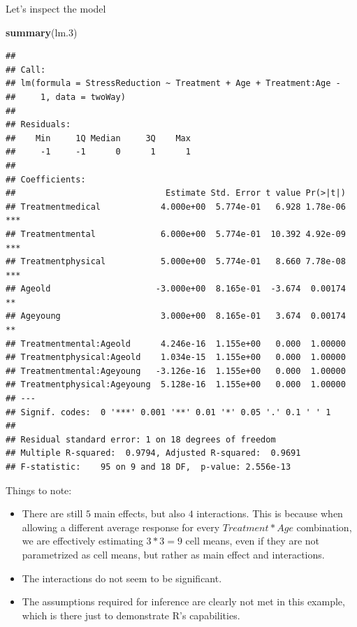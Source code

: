 \documentclass[]{book}
\newenvironment{Shaded}{\begin{snugshade}}{\end{snugshade}}
\newcommand{\KeywordTok}[1]{\textcolor[rgb]{0.13,0.29,0.53}{\textbf{#1}}}
\newcommand{\DecValTok}[1]{\textcolor[rgb]{0.00,0.00,0.81}{#1}}
\newcommand{\NormalTok}[1]{#1}
\providecommand{\tightlist}{%
  \setlength{\itemsep}{0pt}\setlength{\parskip}{0pt}}
\theoremstyle{definition}
\theoremstyle{definition}
\theoremstyle{definition}
\theoremstyle{remark}
\begin{document}
Let's inspect the model

\begin{Shaded}
\begin{Highlighting}[]
\KeywordTok{summary}\NormalTok{(lm.}\DecValTok{3}\NormalTok{)}
\end{Highlighting}
\end{Shaded}

\begin{verbatim}
## 
## Call:
## lm(formula = StressReduction ~ Treatment + Age + Treatment:Age - 
##     1, data = twoWay)
## 
## Residuals:
##    Min     1Q Median     3Q    Max 
##     -1     -1      0      1      1 
## 
## Coefficients:
##                              Estimate Std. Error t value Pr(>|t|)    
## Treatmentmedical            4.000e+00  5.774e-01   6.928 1.78e-06 ***
## Treatmentmental             6.000e+00  5.774e-01  10.392 4.92e-09 ***
## Treatmentphysical           5.000e+00  5.774e-01   8.660 7.78e-08 ***
## Ageold                     -3.000e+00  8.165e-01  -3.674  0.00174 ** 
## Ageyoung                    3.000e+00  8.165e-01   3.674  0.00174 ** 
## Treatmentmental:Ageold      4.246e-16  1.155e+00   0.000  1.00000    
## Treatmentphysical:Ageold    1.034e-15  1.155e+00   0.000  1.00000    
## Treatmentmental:Ageyoung   -3.126e-16  1.155e+00   0.000  1.00000    
## Treatmentphysical:Ageyoung  5.128e-16  1.155e+00   0.000  1.00000    
## ---
## Signif. codes:  0 '***' 0.001 '**' 0.01 '*' 0.05 '.' 0.1 ' ' 1
## 
## Residual standard error: 1 on 18 degrees of freedom
## Multiple R-squared:  0.9794, Adjusted R-squared:  0.9691 
## F-statistic:    95 on 9 and 18 DF,  p-value: 2.556e-13
\end{verbatim}

Things to note:

\begin{itemize}
\tightlist
\item
  There are still \(5\) main effects, but also \(4\) interactions. This
  is because when allowing a different average response for every
  \(Treatment*Age\) combination, we are effectively estimating \(3*3=9\)
  cell means, even if they are not parametrized as cell means, but
  rather as main effect and interactions.
\item
  The interactions do not seem to be significant.
\item
  The assumptions required for inference are clearly not met in this
  example, which is there just to demonstrate R's capabilities.
\end{itemize}
\end{document}
